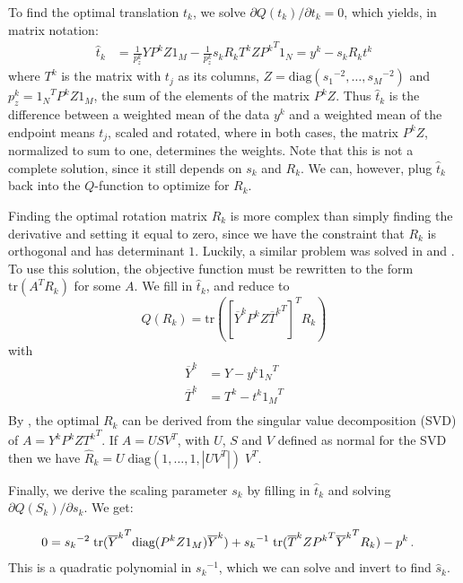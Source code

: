 \documentclass[10pt,a4paper,oneside]{article}
\theoremstyle{definition}
\newcommand{\p}{\mbox{\,.}}
\newcommand{\ol}[1]{\overline{#1}}
\theoremstyle{definition}
\begin{document}
To find the optimal translation $t_k$, we solve $\partial Q(t_k)/\partial t_k = 0$, which yields, in matrix notation:
\begin{align*}
\hat t_k &= \frac{1}{p^k_z}YP^kZ1_M - \frac{1}{p^k_z}s_kR_kT^kZ{P^k}^T1_N = y^k - s_kR_k t^k
\end{align*} 
where $T^k$ is the matrix with $t_j$ as its columns, $Z = \text{diag}({s_1}^{-2}, \ldots, {s_M}^{-2})$ and ${p^k_z} = {1_N}^TP^kZ1_M$, the sum of the elements of the matrix $P^kZ$. Thus $\hat t_k$ is the difference between a weighted mean of the data $y^k$ and a weighted mean of the endpoint means $t_j$, scaled and rotated, where in both cases, the matrix  $P^kZ$, normalized to sum to one, determines the weights. Note that this is not a complete solution, since it still depends on $s_k$ and $R_k$. We can, however, plug $\hat t_k$ back into the $Q$-function to optimize for $R_k$.

Finding the optimal rotation matrix $R_k$ is more complex than simply finding the derivative and setting it equal to zero, since we have the constraint that $R_k$ is orthogonal and has determinant $1$. Luckily, a similar problem was solved in \cite{umeyama1991least} and \cite{myronenko2010point}. To use this solution, the objective function must be rewritten to the form $\text{tr}(A^TR_k)$ for some $A$. We fill in $\hat t_k$, and reduce to
\[ 
Q(R_k) = \text{tr}\left(\left[\ol{Y}^kP^kZ{\ol{T}^k}^T\right]^TR_k\right) 
\]
with 
\begin{align*}
\ol{Y}^k &= Y - y^k {1_N}^T\\
\ol{T}^k &= T^k - t^k {1_M}^T\\
\end{align*}
By \cite[Lemma~1]{myronenko2010point}, the optimal $R_k$ can be derived from the singular value decomposition (SVD) of $A=Y^kP^kZ{T^k}^T$. If $A = USV^T$, with $U$, $S$ and $V$ defined as normal for the SVD then we have $\hat R_k = U \;\text{diag} (1, \ldots, 1, |UV^T|)\; V^T$.

Finally, we derive the scaling parameter $s_k$ by filling in $\hat t_k$ and solving $\partial Q(S_k)/\partial s_k$. We get:

\begin{align*}
0 &= {s_k}^{-2}\;\text{tr}({\ol{Y}^k}^T\text{diag}(P^kZ1_M)\ol{Y}^k) + {s_k}^{-1}\;\text{tr}(\ol{T}^kZ{P^k}^T{\ol{Y}^k}^TR_k) -p^k \p
\end{align*}
This is a quadratic polynomial in ${s_k}^{-1}$, which we can solve and invert to find $\hat s_k$.
\end{document}
